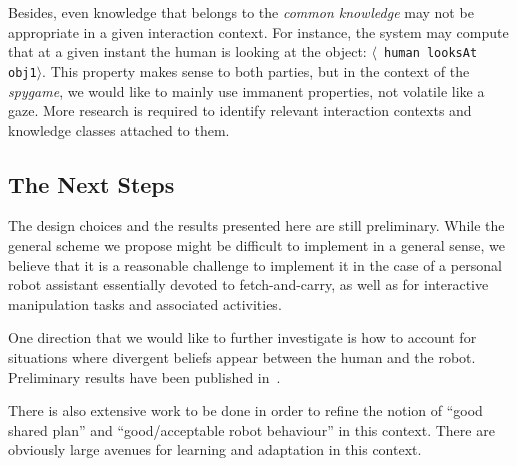 \documentclass[preprint,3p,times]{elsarticle}
\newcommand{\stmt}[1]{{\footnotesize \tt $\langle$ #1\relax$\rangle$}}
\begin{document}
Besides, even knowledge that belongs to the \emph{common knowledge} may not be
appropriate in a given interaction context. For instance, the system may
compute that at a given instant the human is looking at the object: \stmt{human
looksAt obj1}. This property makes sense to both parties, but in the context of
the \emph{spygame}, we would like to mainly use immanent properties, not
volatile like a gaze. More research is required to identify relevant
interaction contexts and knowledge classes attached to them.

\subsection{The Next Steps}


The design choices and the results presented here are still preliminary.
While the general scheme we propose might be difficult to implement in
a general sense, we believe that it is a reasonable challenge to
implement it in the case of a personal robot assistant essentially
devoted to fetch-and-carry, as well as for interactive manipulation
tasks and associated activities.

One direction that we would like to further investigate is how to account for
situations where divergent beliefs appear between the human and the robot.
Preliminary results have been published in~\cite{warnier2012when}.

There is also extensive work to be done in order to refine the notion of ``good
shared plan'' and ``good/acceptable robot behaviour'' in this context. There are
obviously large avenues for learning and adaptation in this context.
\end{document}
